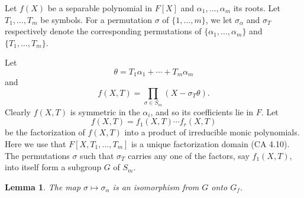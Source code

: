 \documentclass[a4paper,11pt,final,openany]{memoir}
\newtheorem{lemma}[X]{Lemma}
\theoremstyle{nonumberplain}
\begin{document}
Let $f(X)$ be a separable polynomial in $F[X]$ and $\alpha_{1},\ldots
,\alpha_{m}$ its roots. Let $T_{1},\ldots,T_{m}$ be symbols. For a permutation
$\sigma$ of $\{1,\ldots,m\}$, we let $\sigma_{\alpha}$ and $\sigma_{T}$
respectively denote the corresponding permutations of $\{\alpha_{1}%
,\ldots,\alpha_{m}\}$ and $\{T_{1},\ldots,T_{m}\}$.

Let%
\[
\theta=T_{1}\alpha_{1}+\cdots+T_{m}\alpha_{m}%
\]
and%
\[
f(X,T)=\prod_{\sigma\in S_{m}}(X-\sigma_{T}\theta).
\]
Clearly $f(X,T)$ is symmetric in the $\alpha_{i}$, and so its coefficients lie
in $F$. Let%
\begin{equation}
f(X,T)=f_{1}(X,T)\cdots f_{r}(X,T) \label{eq13}%
\end{equation}
be the factorization of $f(X,T)$ into a product of irreducible monic
polynomials. Here we use that $F[X,T_{1},\ldots,T_{m}]$ is a unique
factorization domain (CA 4.10). The permutations $\sigma$ such that
$\sigma_{T}$ carries any one of the factors, say $f_{1}(X,T)$, into itself
form a subgroup $G$ of $S_{m}$.

\begin{lemma}
\label{cg25}The map $\sigma\mapsto\sigma_{\alpha}$ is an isomorphism from $G$
onto $G_{f}$.
\end{lemma}
\end{document}
